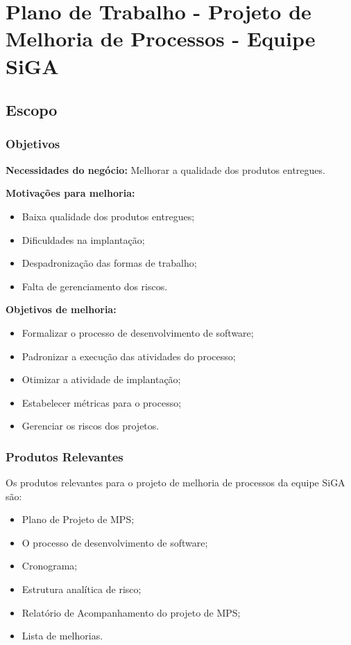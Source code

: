 \chapter{Plano de Trabalho - Projeto de Melhoria de Processos - Equipe SiGA}

\section{Escopo}

\subsection{Objetivos}

\textbf{Necessidades do negócio:} 
Melhorar a qualidade dos produtos entregues.

\textbf{Motivações para melhoria:} 
\begin{itemize}
	\item Baixa qualidade dos produtos entregues;
	\item Dificuldades na implantação;
	\item Despadronização das formas de trabalho;
	\item Falta de gerenciamento dos riscos.
\end{itemize}

\textbf{Objetivos de melhoria:} 
\begin{itemize}
	\item Formalizar o processo de desenvolvimento de software;
	\item Padronizar a execução das atividades do processo;
	\item Otimizar a atividade de implantação;
	\item Estabelecer métricas para o processo;
	\item Gerenciar os riscos dos projetos.
\end{itemize}

\subsection{Produtos Relevantes}

	Os produtos relevantes para o projeto de melhoria de processos da equipe SiGA são:
	
	\begin{itemize}
		\item Plano de Projeto de MPS;
		\item O processo de desenvolvimento de software;
		\item Cronograma;
		\item Estrutura analítica de risco;
		\item Relatório de Acompanhamento do projeto de MPS;
		\item Lista de melhorias.
	\end{itemize}


